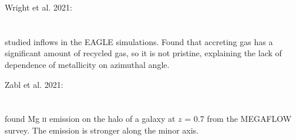 \hline

Wright et al. 2021: \\
\citet{2021MNRAS.504.5702W} \\
\citep{2021MNRAS.504.5702W} \\
studied inflows in the EAGLE simulations. Found that accreting gas has a
significant amount of recycled gas, so it is not pristine, explaining the lack
of dependence of metallicity on azimuthal angle. \\

\hline

Zabl et al. 2021: \\
\citet{2021MNRAS.507.4294Z} \\
\citep{2021MNRAS.507.4294Z} \\
found Mg \textsc{ii} emission on the halo of a galaxy at $z$ = 0.7 from the
MEGAFLOW survey. The emission is stronger along the minor axis. \\
